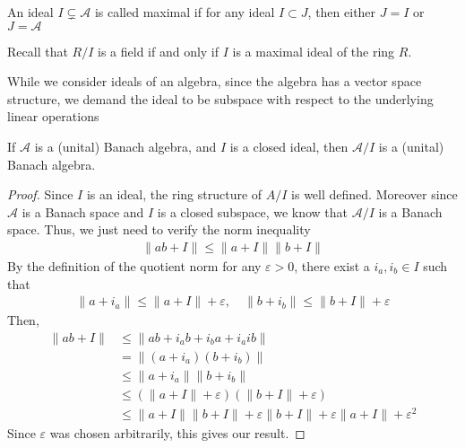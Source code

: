 

\begin{definition}
  An ideal $I \subsetneq \mathcal{A}$ is called maximal if for any
  ideal $I \subset J$, then either $J = I$ or $J = \mathcal{A}$
\end{definition}

\begin{proposition}
  Recall that $R/I$ is a field if and only if $I$ is a
  maximal ideal of the ring $R$.
\end{proposition}

\begin{remark}
  While we consider ideals of an algebra, since the algebra has a
  vector space structure, we demand the ideal to be subspace with
  respect to the underlying linear operations
\end{remark}

\begin{lemma}
  If $\mathcal{A}$ is a (unital) Banach algebra, and $I$ is a closed
  ideal, then $\mathcal{A}/I$ is a (unital) Banach algebra.
\end{lemma}
\begin{proof}
  Since $I$ is an ideal, the ring structure of $A/I$ is well defined.
  Moreover since $\mathcal{A}$ is a Banach space and $I$ is a closed
  subspace, we know that $\mathcal{A}/I$ is a Banach space. Thus, we
  just need to verify the norm inequality
  \begin{align*}
    \|ab + I\| \le \|a + I\|\|b + I\|
  \end{align*}
  By the definition of the quotient norm for any $\varepsilon > 0$,
  there exist a $i_a, i_b \in
  I$ such that
  \begin{align*}
    \|a + i_a\| \le \|a + I\| + \varepsilon, \quad \|b + i_b\| \le
    \|b + I\| + \varepsilon
  \end{align*}
  Then,
  \begin{align*}
    \|ab + I\| &\le \|ab + i_ab + i_b a + i_aib\|  \\
    &= \|(a + i_a)( b + i_b)\| \\
    &\le \| a + i_a\| \|b + i_b\| \\
    &\le (\|a + I\| + \varepsilon)(\|b + I\| + \varepsilon) \\
    &\le \|a + I\|\|b + I\| + \varepsilon \|b  + I\| + \varepsilon
    \|a + I\| + \varepsilon^2
  \end{align*}
  Since $\varepsilon$ was chosen arbitrarily, this gives our result.
\end{proof}

